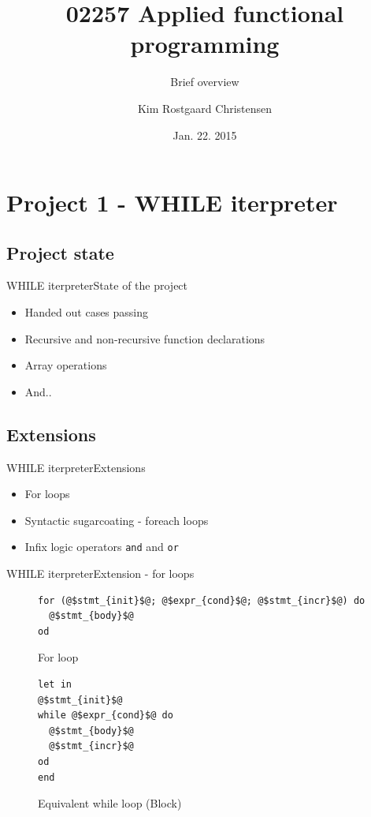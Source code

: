 \documentclass{beamer}
\title{02257 Applied functional programming}
\subtitle{Brief overview}
\author{Kim Rostgaard Christensen}
\institute[Techical University of Denmark] %
{
  
  DTU Compute\\
  Techical University of Denmark}
\date{Jan. 22. 2015}
\begin{document}
\begin{frame}
  \titlepage
\end{frame}

\section{Project 1 - WHILE iterpreter}
\subsection{Project state}

\begin{frame}{WHILE iterpreter}{State of the project}
  \begin{itemize}
  \item {
    Handed out cases passing
  }
  \item {
    Recursive and non-recursive function declarations
  }
  \item {
    Array operations
  }
  \pause
  \item {
    And..
  }
  \end{itemize}
  
\end{frame}

\subsection{Extensions}
\begin{frame}{WHILE iterpreter}{Extensions}
  \begin{itemize}
  \item {
    For loops
  }
  \item {
    Syntactic sugarcoating - foreach loops
  }
  \item {
    Infix logic operators \alert{\texttt{and}} and \alert{\texttt{or}}
  }
  \end{itemize}
\end{frame}

\begin{frame}[fragile]{WHILE iterpreter}{Extension - for loops}

\begin{figure}
\begin{lstlisting}
for (@$stmt_{init}$@; @$expr_{cond}$@; @$stmt_{incr}$@) do
  @$stmt_{body}$@
od
\end{lstlisting}
\caption{For loop}
\end{figure}

\begin{figure}
\begin{lstlisting}
let in
@$stmt_{init}$@
while @$expr_{cond}$@ do 
  @$stmt_{body}$@
  @$stmt_{incr}$@
od
end
\end{lstlisting}
\caption{Equivalent while loop (Block)}
\end{figure}
\end{frame}
\end{document}
